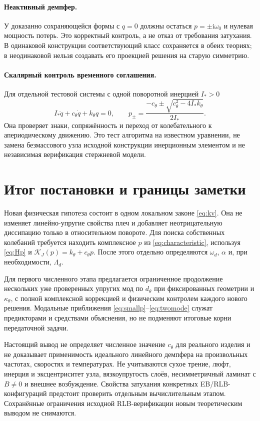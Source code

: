\documentclass[11pt,a4paper]{article}
\numberwithin{equation}{section}
\newcommand{\ii}{\mathrm i}
\newcommand{\kth}{k_\theta}
\newcommand{\cth}{c_\theta}
\newcommand{\KJ}{\mathcal K_J}
\begin{document}
\paragraph{Неактивный демпфер.}
У доказанно сохраняющейся формы с $q=0$ должны остаться
$p=\pm\ii\omega_0$ и нулевая мощность потерь. Это корректный контроль,
а не отказ от требования затухания. В одинаковой конструкции соответствующий
класс сохраняется в обеих теориях; в неодинаковой нельзя создавать его
проекцией решения на старую симметрию.

\paragraph{Скалярный контроль временного соглашения.}
Для отдельной тестовой системы с одной поворотной инерцией $I_*>0$
\[
 I_*\ddot q+\cth\dot q+\kth q=0,
 \qquad
 p_\pm=\frac{-\cth\pm\sqrt{\cth^2-4I_*\kth}}{2I_*}.
\]
Она проверяет знаки, сопряжённость и переход от колебательного к
апериодическому движению. Это тест алгоритма на известном уравнении,
не замена безмассового узла исходной конструкции инерционным элементом
и не независимая верификация стержневой модели.

\section{Итог постановки и границы заметки}

Новая физическая гипотеза состоит в одном локальном законе
\eqref{eq:kv}. Она не изменяет линейно-упругие свойства плеч и добавляет
неотрицательную диссипацию только в относительном повороте.
Для поиска собственных колебаний требуется находить комплексное $p$
из \eqref{eq:characteristic}, используя \eqref{eq:Hp} и
$\KJ(p)=\kth+\cth p$. После этого отдельно определяются
$\omega_d$, $\alpha$ и, при необходимости, $\Lambda_d$.

Для первого численного этапа предлагается ограниченное продолжение
нескольких уже проверенных упругих мод по $d_\theta$ при фиксированных
геометрии и $\kappa_\theta$, с полной комплексной коррекцией и физическим
контролем каждого нового решения. Модальные приближения
\eqref{eq:smallp}--\eqref{eq:twomode} служат предикторами и средствами
объяснения, но не подменяют итоговые корни передаточной задачи.

Настоящий вывод не определяет численное значение $\cth$ для реального
изделия и не доказывает применимость идеального линейного демпфера на
произвольных частотах, скоростях и температурах. Не учитываются сухое
трение, люфт, инерция и эксцентриситет узла, вязкоупругость слоёв,
несимметричный ламинат с $B\ne0$ и внешнее возбуждение. Свойства
затухания конкретных EB/RLB-конфигураций предстоит проверить отдельным
вычислительным этапом. Сохранённые ограничения исходной RLB-верификации
новым теоретическим выводом не снимаются.
\end{document}
